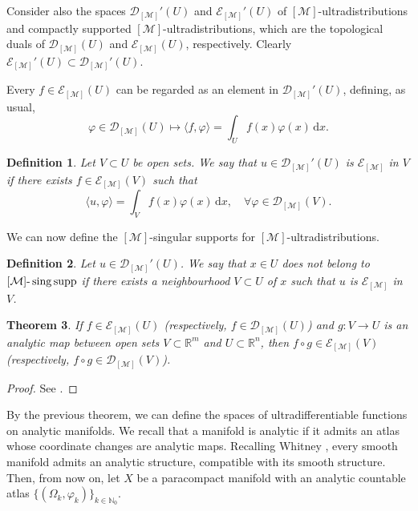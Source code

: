 \documentclass[11pt,reqno]{amsart}
\numberwithin{equation}{section}
\newcommand{\dx}{{\mathrm{d}x}}
\newtheorem{theorem}{Theorem}[section]
\newtheorem{definition}[theorem]{Definition}
\newcommand{\R}{{\mathbb{R}}} %
\newcommand{\N}{{\mathbb{N}}} %
\newcommand{\E}{{\mathcal{E}}}
\newcommand{\D}{{\mathcal{D}}}
\newcommand{\M}{{\mathcal{M}}} %
\begin{document}
Consider also the spaces $\D_{[\M]}'(U)$ and $\E_{[\M]}'(U)$ of $[\M]$-ultradistributions and compactly supported $[\M]$-ultradistributions, which are the topological duals of $\D_{[\M]}(U)$ and $\E_{[\M]}(U)$, respectively. Clearly $\E_{[\M]}'(U)\subset \D_{[\M]}'(U)$.

Every $f\in \E_{[\M]}(U)$ can be regarded as an element in $\D_{[\M]}'(U)$, defining, as usual,
%
\[\varphi\in \mathcal{D}_{[\M]}(U)\mapsto \langle f, \varphi \rangle = \int_{U} f(x)\varphi(x)\,\dx.\]

\begin{definition}
	Let $V\subset U$ be open sets. We say that $u\in \D_{[\M]}'(U)$ is $\E_{[\M]}$ in $V$ if there exists $f\in \E_{[\M]}(V)$ such that
	\[\langle u,\varphi\rangle = \int_{V}f(x)\varphi(x)\,\dx,\quad \forall\varphi\in \D_{[\M]}(V).\]
\end{definition}



We can now define the $[\M]$-singular supports for $[\M]$-ultradistributions.



\begin{definition}
	Let $u\in \mathcal{D}_{[\M]}'(U)$. We say that $x\in U$ does not belong to $[\M]\text{-\,}\mathrm{sing\,supp}$ if there exists a neighbourhood $V\subset U$ of $x$ such that $u$ is $\mathcal{E}_{[\M]}$ in $V$.
\end{definition} 







\begin{theorem}\label{inv_analytic}
	If $f\in \mathcal{E}_{[\M]}(U)$ (respectively, $f\in \mathcal{D}_{[\M]}(U)$) and $g:V\to U$ is an analytic map between open sets $V\subset\R^m$ and $U\subset\R^n$, then $f\circ g\in \mathcal{E}_{[\M]}(V)$ (respectively, $f\circ g\in \mathcal{D}_{[\M]}(V)$).
\end{theorem}
%
\begin{proof}
	See \cite[Proposition 8.4.1]{Hormander_1}.
\end{proof}


By the previous theorem, we can define the spaces of ultradifferentiable functions on analytic manifolds. We recall that a manifold is analytic if it admits an atlas whose coordinate changes are analytic maps. Recalling Whitney \cite{Whitney}, every smooth manifold admits an analytic structure,
compatible with its smooth structure. Then, from now on, let $X$ be a paracompact manifold with an analytic countable atlas $\{(\Omega_k,\varphi_k)\}_{k\in\N_0}$. 
\end{document}
